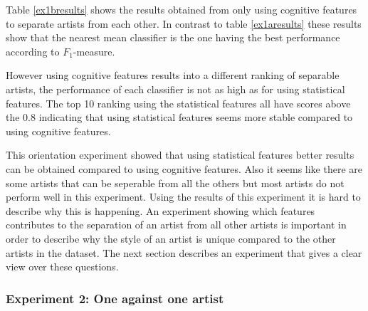 Table \ref{ex1bresults} shows the results obtained from only using cognitive features to separate artists from each other.
In contrast to table \ref{ex1aresults} these results show that the nearest mean classifier is the one having the best performance according to $F_1$-measure.

However using cognitive features results into a different ranking of separable artists, the performance of each classifier is not as high as for using statistical features.
The top 10 ranking using the statistical features all have scores above the 0.8 indicating that using statistical features seems more stable compared to using cognitive features.

This orientation experiment showed that using statistical features better results can be obtained compared to using cognitive features.
Also it seems like there are some artists that can be seperable from all the others but most artists do not perform well in this experiment.
Using the results of this experiment it is hard to describe why this is happening. 
An experiment showing which features contributes to the separation of an artist from all other artists is important in order to describe why the style of an artist is unique compared to the other artists in the dataset.
The next section describes an experiment that gives a clear view over these questions.

\subsubsection{Experiment 2: One against one artist}

%
%

